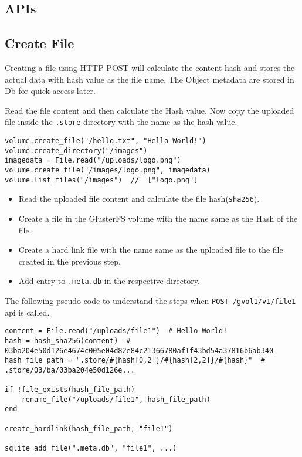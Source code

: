 \documentclass[10pt,a4paper]{article}
\begin{document}
\begin{multicols*}{2}
\section{APIs}
\subsection{Create File}

Creating a file using HTTP POST will calculate the content hash and stores the actual data with hash value as the file name. The Object metadata are stored in Db for quick access later.

Read the file content and then calculate the Hash value. Now copy the uploaded file inside the \texttt{.store} directory with the name as the hash value.

\begin{verbatim}
volume.create_file("/hello.txt", "Hello World!")
volume.create_directory("/images")
imagedata = File.read("/uploads/logo.png")
volume.create_file("/images/logo.png", imagedata)
volume.list_files("/images")  //  ["logo.png"]
\end{verbatim}

\begin{itemize}
\item Read the uploaded file content and calculate the file hash(\texttt{sha256}).
\item Create a file in the GlusterFS volume with the name same as the Hash of the file.
\item Create a hard link file with the name same as the uploaded file to the file created in the previous step.
\item Add entry to \texttt{.meta.db} in the respective directory.
\end{itemize}

The following pseudo-code to understand the steps when \texttt{POST /gvol1/v1/file1} api is called.

\begin{verbatim}
content = File.read("/uploads/file1")  # Hello World!
hash = hash_sha256(content)  # 03ba204e50d126e4674c005e04d82e84c21366780af1f43bd54a37816b6ab340
hash_file_path = ".store/#{hash[0,2]}/#{hash[2,2]}/#{hash}"  # .store/03/ba/03ba204e50d126e...

if !file_exists(hash_file_path)
    rename_file("/uploads/file1", hash_file_path)
end

create_hardlink(hash_file_path, "file1")

sqlite_add_file(".meta.db", "file1", ...)
\end{verbatim}


\end{multicols*}
\end{document}
